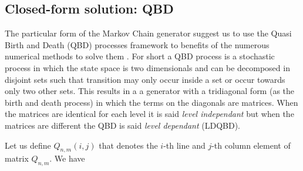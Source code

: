 \documentclass[conference]{IEEEtran}
\begin{document}
\subsection{Closed-form solution:  QBD}

The particular form of the Markov Chain generator suggest us to use the Quasi Birth and Death (QBD) processes framework to benefits of the numerous
numerical methods to solve them \cite{Neuts1981}. For short a QBD process is a stochastic process in which the state space is two dimensionals and can 
be decomposed in disjoint sets such that transition may only occur inside a set or occur towards only two other sets.
This results in a a generator with a tridiagonal form (as the birth and death process) in which the terms on the diagonals are matrices.
When the matrices are identical for each level it is said \emph{level independant} but when the matrices are different  the QBD
is said \emph{level dependant} (LDQBD).


Let us define $Q_{n,m}(i,j)$ that denotes the $i$-th line and $j$-th column element of matrix $Q_{n,m}$. We have
\end{document}
